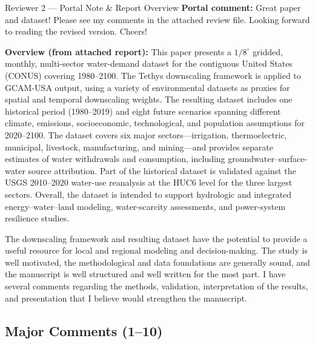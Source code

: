 \documentclass[11pt,letterpaper]{article}
\begin{document}
\begin{generalbox}{Reviewer 2 --- Portal Note \& Report Overview}
\textbf{Portal comment:} Great paper and dataset! Please see my comments in the attached review file. Looking forward to reading the revised version. Cheers!

\medskip
\textbf{Overview (from attached report):}
This paper presents a $1/8^{\circ}$ gridded, monthly, multi-sector water-demand dataset for the contiguous United States (CONUS) covering 1980--2100. The Tethys downscaling framework is applied to GCAM-USA output, using a variety of environmental datasets as proxies for spatial and temporal downscaling weights. The resulting dataset includes one historical period (1980--2019) and eight future scenarios spanning different climate, emissions, socioeconomic, technological, and population assumptions for 2020--2100. The dataset covers six major sectors---irrigation, thermoelectric, municipal, livestock, manufacturing, and mining---and provides separate estimates of water withdrawals and consumption, including groundwater--surface-water source attribution. Part of the historical dataset is validated against the USGS 2010--2020 water-use reanalysis at the HUC6 level for the three largest sectors. Overall, the dataset is intended to support hydrologic and integrated energy--water--land modeling, water-scarcity assessments, and power-system resilience studies.

The downscaling framework and resulting dataset have the potential to provide a useful resource for local and regional modeling and decision-making. The study is well motivated, the methodological and data foundations are generally sound, and the manuscript is well structured and well written for the most part. I have several comments regarding the methods, validation, interpretation of the results, and presentation that I believe would strengthen the manuscript.
\end{generalbox}

\subsection{Major Comments (1--10)}
\end{document}
